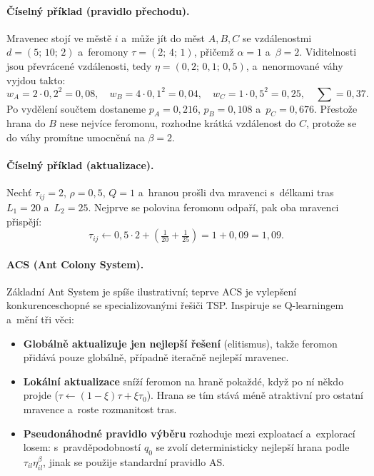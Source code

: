 \documentclass[11pt,a4paper]{article}
\theoremstyle{definition}
\begin{document}
\paragraph{Číselný příklad (pravidlo přechodu).} Mravenec stojí ve městě $i$
a~může jít do měst $A, B, C$ se vzdálenostmi $d = (5;\,10;\,2)$
a~feromony $\tau = (2;\,4;\,1)$, přičemž $\alpha = 1$ a~$\beta = 2$.
Viditelnosti jsou převrácené vzdálenosti, tedy $\eta = (0{,}2;\,0{,}1;\,0{,}5)$, a~nenormované
váhy vyjdou takto:
\[
w_A = 2 \cdot 0{,}2^2 = 0{,}08,\quad
w_B = 4 \cdot 0{,}1^2 = 0{,}04,\quad
w_C = 1 \cdot 0{,}5^2 = 0{,}25,\quad \textstyle\sum = 0{,}37 .
\]
Po vydělení součtem dostaneme $p_A = 0{,}216$, $p_B = 0{,}108$ a~$p_C = 0{,}676$. Přestože
hrana do $B$ nese nejvíce feromonu, rozhodne krátká vzdálenost do $C$, protože se do váhy
promítne umocněná na $\beta = 2$.

\paragraph{Číselný příklad (aktualizace).} Nechť $\tau_{ij} = 2$, $\rho = 0{,}5$,
$Q = 1$ a~hranou prošli dva mravenci s~délkami tras $L_1 = 20$ a~$L_2 = 25$. Nejprve se
polovina feromonu odpaří, pak oba mravenci přispějí:
\[
\tau_{ij} \gets 0{,}5 \cdot 2 + \left(\tfrac{1}{20} + \tfrac{1}{25}\right)
= 1 + 0{,}09 = 1{,}09 .
\]

\paragraph{ACS (Ant Colony System).} Základní Ant System je spíše ilustrativní; teprve ACS je
vylepšení konkurenceschopné se specializovanými řešiči TSP. Inspiruje se Q-learningem a~mění
tři věci:
\begin{itemize}
\item \textbf{Globálně aktualizuje jen nejlepší řešení} (elitismus), takže feromon přidává
  pouze globálně, případně iteračně nejlepší mravenec.
\item \textbf{Lokální aktualizace} sníží feromon na hraně pokaždé, když po ní někdo projde
  ($\tau \gets (1-\xi)\tau + \xi\tau_0$). Hrana se tím stává méně atraktivní pro ostatní
  mravence a~roste rozmanitost tras.
\item \textbf{Pseudonáhodné pravidlo výběru} rozhoduje mezi exploatací a~explorací losem:
  s~pravděpodobností $q_0$ se zvolí deterministicky nejlepší hrana podle
  $\tau_{il}\eta_{il}^{\beta}$, jinak se použije standardní pravidlo AS.
\end{itemize}
\end{document}
